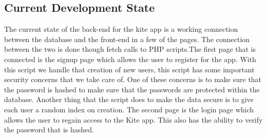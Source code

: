 \documentclass[compsoc, 10, draftclsnofoot, onecolumn]{IEEEtran}
\begin{document}
\subsection{Current Development State}
The current state of the back-end for the kite app is a working connection between the database and the front-end in a few of the pages. The connection between the two is done though fetch calls to PHP scripts.The first page that is connected is the signup page which allows the user to register for the app. With this script we handle that creation of new users, this script has some important security concerns that we take care of. One of these concerns is to make sure that the password is hashed to make sure that the passwords are protected within the database. Another thing that the script does to make the data secure is to give each user a random index on creation. The second page is the login page which allows the user to regain access to the Kite app. This also has the ability to verify the password that is hashed. 
\end{document}
